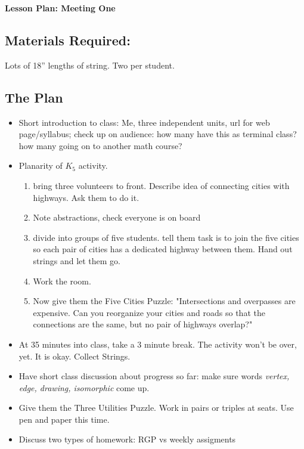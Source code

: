 \documentclass[12pt]{amsart}
\theoremstyle{definition}
\begin{document}
\begin{center}
\textbf{\Huge
Lesson Plan: Meeting One
}
\end{center}
\vspace{.5in}

\subsection*{Materials Required:} Lots of 18'' lengths of string. Two per student.

\subsection*{The Plan}

\begin{itemize}

\item Short introduction to class: Me, three independent units, url for web page/syllabus; check up on audience: how many have this as terminal class? how many going on to another math course?

\item Planarity of $K_5$ activity. 
\begin{enumerate}
\item bring three volunteers to front. Describe idea of connecting cities with highways. Ask them to do it.
\item Note abstractions, check everyone is on board
\item divide into groups of five students. tell them task is to join the five cities so each pair of cities has a dedicated 
highway between them. Hand out strings and let them go.
\item Work the room.
\item Now give them the Five Cities Puzzle:  "Intersections and overpasses are expensive. Can you reorganize your cities and roads so that the connections are the same, but no pair of highways overlap?"
\end{enumerate}

\item At 35 minutes into class, take a 3 minute break. The activity won't be over, yet. It is okay. Collect Strings.

\item Have short class discussion about progress so far: make sure words \emph{vertex, edge, drawing, isomorphic} come up.

\item Give them the Three Utilities Puzzle. Work in pairs or triples at seats. Use pen and paper this time.
 
\item Discuss two types of homework: RGP vs weekly assigments
 
\end{itemize}
\end{document}
